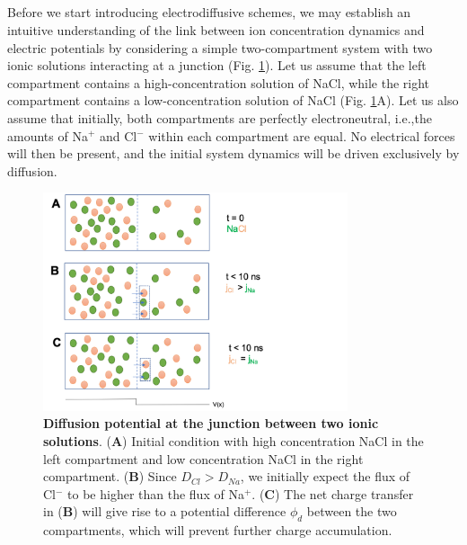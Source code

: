 \subsection{}
\label{sec:Schemes:LJpot}
Before we start introducing electrodiffusive schemes, we may establish an intuitive understanding of the link between ion concentration dynamics and electric potentials by considering a simple two-compartment system with two ionic solutions interacting at a junction  (Fig. \ref{Schemes:fig:diffpot}). Let us assume that the left compartment contains a high-concentration solution of NaCl, while the right compartment contains a low-concentration solution of NaCl (Fig. \ref{Schemes:fig:diffpot}A). Let us also assume that initially, both compartments are perfectly electroneutral, i.e.,the amounts of Na$^+$ and Cl$^-$ within each compartment are equal. No  electrical forces will then be present, and the initial system dynamics will be driven exclusively by diffusion. 

\begin{figure}[!ht]
\begin{center}
\includegraphics[width=0.8\textwidth]{Figures/Schemes/Diffusionpot.png}
\end{center}
\caption{\textbf{Diffusion potential at the junction between two ionic solutions}. ({\bf A}) Initial condition with high concentration NaCl in the left compartment and low concentration NaCl in the right compartment. ({\bf B}) Since $D_{Cl} > D_{Na}$, we initially expect the flux of Cl$^-$ to be higher than the flux of Na$^+$. ({\bf C}) The net charge transfer in ({\bf B}) will give rise to a potential difference $\phi_d$ between the two compartments, which will prevent further charge accumulation. }
\label{Schemes:fig:diffpot}
\end{figure}

